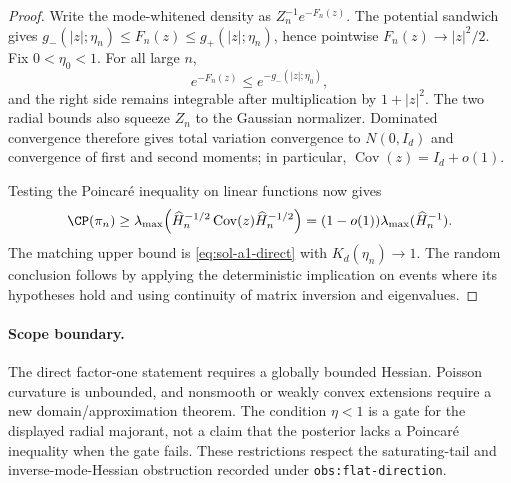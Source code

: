 \documentclass[../main.tex]{subfiles}
\begin{document}
\begin{proof}
Write the mode-whitened density as $Z_n^{-1}e^{-F_n(z)}$.  The potential sandwich gives
$g_-(|z|;\eta_n)\le F_n(z)\le g_+(|z|;\eta_n)$, hence pointwise
$F_n(z)\to|z|^2/2$.  Fix $0<\eta_0<1$.  For all large $n$,
\[
 e^{-F_n(z)}\le e^{-g_-(|z|;\eta_0)},
\]
and the right side remains integrable after multiplication by $1+|z|^2$.  The two radial bounds
also squeeze $Z_n$ to the Gaussian normalizer.  Dominated convergence therefore gives total
variation convergence to $N(0,I_d)$ and convergence of first and second moments; in particular,
$\operatorname{Cov}(z)=I_d+o(1)$.

Testing the Poincar\'e inequality on linear functions now gives
\[
 \CP(\pi_n)\ge
 \lambda_{\max}\!\left(
  \widehat H_n^{-1/2}\operatorname{Cov}(z)\widehat H_n^{-1/2}
 \right)
 =(1-o(1))\lambda_{\max}(\widehat H_n^{-1}).
\]
The matching upper bound is \eqref{eq:sol-a1-direct} with $K_d(\eta_n)\to1$.  The random
conclusion follows by applying the deterministic implication on events where its hypotheses hold
and using continuity of matrix inversion and eigenvalues.
\end{proof}

\paragraph{Scope boundary.}
The direct factor-one statement requires a globally bounded Hessian.  Poisson curvature is
unbounded, and nonsmooth or weakly convex extensions require a new domain/approximation theorem.
The condition $\eta<1$ is a gate for the displayed radial majorant, not a claim that the posterior
lacks a Poincar\'e inequality when the gate fails.  These restrictions respect the saturating-tail
and inverse-mode-Hessian obstruction recorded under \texttt{obs:flat-direction}.
\end{document}
